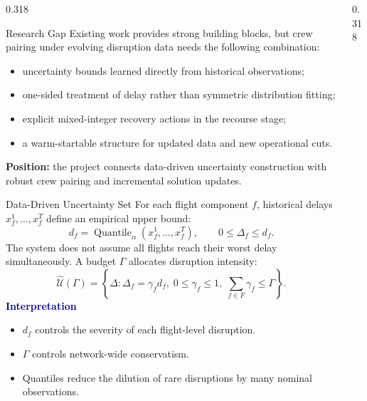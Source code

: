 \documentclass[final]{beamer}
\newcommand{\tightitem}{\setlength{\itemsep}{0.10em}\setlength{\parsep}{0pt}\setlength{\topsep}{0pt}}
\newcommand{\minihead}[1]{\vspace{0.12cm}\textbf{\textcolor{navy}{#1}}\par}
\newcommand{\eqsmall}[1]{\begingroup\scriptsize #1\endgroup}
\begin{document}
\begin{frame}[t]
\begin{minipage}[t]{0.968\textwidth}
\begin{columns}[t,totalwidth=\linewidth]
\begin{column}{0.318\linewidth}
\begin{exampleblock}{Research Gap}
Existing work provides strong building blocks, but crew pairing under evolving disruption data needs the following combination:
\begin{itemize}\tightitem
  \item uncertainty bounds learned directly from historical observations;
  \item one-sided treatment of delay rather than symmetric distribution fitting;
  \item explicit mixed-integer recovery actions in the recourse stage;
  \item a warm-startable structure for updated data and new operational cuts.
\end{itemize}
\textbf{Position:} the project connects data-driven uncertainty construction with robust crew pairing and incremental solution updates.
\end{exampleblock}

\begin{alertblock}{Data-Driven Uncertainty Set}
For each flight component \(f\), historical delays \(x_f^1,\ldots,x_f^T\) define an empirical upper bound:
\eqsmall{
\[
d_f=\operatorname{Quantile}_{\alpha}(x_f^1,\ldots,x_f^T),\qquad 0\leq \Delta_f\leq d_f.
\]
}
The system does not assume all flights reach their worst delay simultaneously. A budget \(\Gamma\) allocates disruption intensity:
\eqsmall{
\[
\widehat{\mathcal U}(\Gamma)=
\left\{\Delta:\Delta_f=\gamma_f d_f,\;0\leq\gamma_f\leq 1,\;
\sum_{f\in F}\gamma_f\leq\Gamma\right\}.
\]
}
\minihead{Interpretation}
\begin{itemize}\tightitem
  \item \(d_f\) controls the severity of each flight-level disruption.
  \item \(\Gamma\) controls network-wide conservatism.
  \item Quantiles reduce the dilution of rare disruptions by many nominal observations.
\end{itemize}
\end{alertblock}

\end{column}

\begin{column}{0.318\linewidth}


\end{column}
\end{columns}
\end{minipage}
\end{frame}
\end{document}
